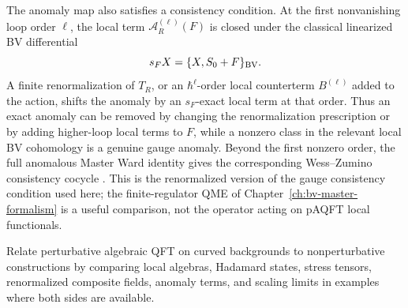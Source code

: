 The anomaly map also satisfies a consistency condition.  At the first
nonvanishing loop order \(\ell\), the local term
\(\mathcal A_R^{(\ell)}(F)\) is closed under the classical linearized BV
differential
\[
  s_FX=\{X,S_0+F\}_{\rm BV}.
\]
A finite renormalization of \(T_R\), or an \(\hbar^\ell\)-order local
counterterm \(B^{(\ell)}\) added to the action, shifts the anomaly by an
\(s_F\)-exact local term at that order.  Thus an exact anomaly can be removed
by changing the renormalization prescription or by adding higher-loop local
terms to \(F\), while a nonzero class in the relevant local BV cohomology is a
genuine gauge anomaly.  Beyond the first nonzero order, the full anomalous
Master Ward identity gives the corresponding Wess--Zumino consistency cocycle
\cite{BrunettiDuetschFredenhagenRejzner2022UAMWI}.  This is the renormalized
version of the gauge consistency condition used here; the finite-regulator QME
of Chapter~\ref{ch:bv-master-formalism} is a useful comparison, not the
operator acting on pAQFT local functionals.

\begin{openproblem}
\label{op:nonperturbative-paqft-comparison}
Relate perturbative algebraic QFT on curved backgrounds to nonperturbative
constructions by comparing local algebras, Hadamard states, stress tensors,
renormalized composite fields, anomaly terms, and scaling limits in examples
where both sides are available.
\end{openproblem}

